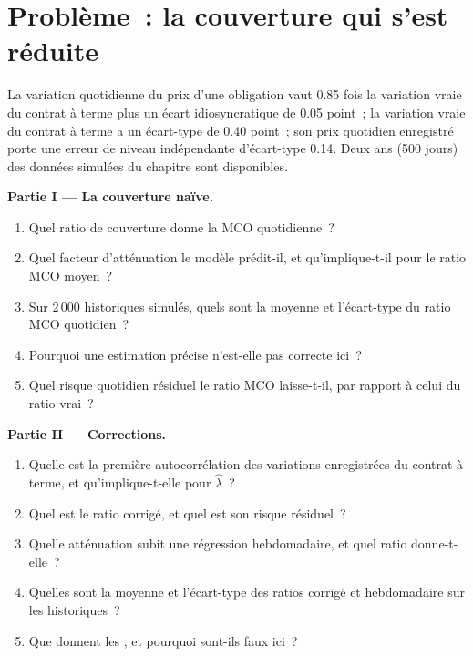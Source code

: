 \section{Problème~: la couverture qui s'est réduite}

\begin{problem}\label{pb:qm:linear-models-under-stress:1}
La variation quotidienne du prix d'une obligation vaut 0.85 fois la variation vraie du contrat à terme plus un écart idiosyncratique de 0.05 point~; la variation vraie du contrat à terme a un écart-type
de 0.40 point~; son prix quotidien enregistré porte une erreur de niveau indépendante d'écart-type 0.14. Deux ans (500 jours) des
données simulées du chapitre sont disponibles.

\medskip\noindent\textbf{Partie I --- La couverture naïve.}
\begin{enumerate}
\item Quel ratio de couverture donne la MCO quotidienne~?
\item Quel facteur d'atténuation le modèle prédit-il, et qu'implique-t-il pour le ratio MCO moyen~?
\item Sur 2\,000 historiques simulés, quels sont la moyenne et l'écart-type du ratio MCO quotidien~?
\item Pourquoi une estimation précise n'est-elle pas correcte ici~?
\item Quel risque quotidien résiduel le ratio MCO laisse-t-il, par rapport à celui du ratio vrai~?
\end{enumerate}

\medskip\noindent\textbf{Partie II --- Corrections.}
\begin{enumerate}[resume]
\item Quelle est la première autocorrélation des variations enregistrées du contrat à terme, et qu'implique-t-elle pour $\hat\lambda$~?
\item Quel est le ratio corrigé, et quel est son risque résiduel~?
\item Quelle atténuation subit une régression hebdomadaire, et quel ratio donne-t-elle~?
\item Quelles sont la moyenne et l'écart-type des ratios corrigé et hebdomadaire sur les historiques~?
\item Que donnent les , et pourquoi sont-ils faux ici~?
\end{enumerate}


\end{problem}
